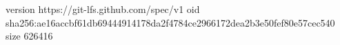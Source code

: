 version https://git-lfs.github.com/spec/v1
oid sha256:ae16accbf61db69444914178da2f4784ce2966172dea2b3e50fef80e57cec540
size 626416
